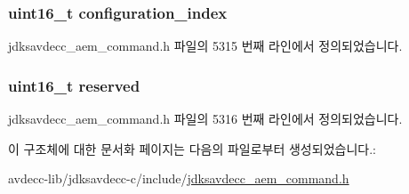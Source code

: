 \subsubsection[{\texorpdfstring{configuration\+\_\+index}{configuration_index}}]{\setlength{\rightskip}{0pt plus 5cm}uint16\+\_\+t configuration\+\_\+index}\hypertarget{structjdksavdecc__aem__command__write__descriptor__response_afaad1bd7c66f9611e134d8c5ce98f444}{}\label{structjdksavdecc__aem__command__write__descriptor__response_afaad1bd7c66f9611e134d8c5ce98f444}


jdksavdecc\+\_\+aem\+\_\+command.\+h 파일의 5315 번째 라인에서 정의되었습니다.

\subsubsection[{\texorpdfstring{reserved}{reserved}}]{\setlength{\rightskip}{0pt plus 5cm}uint16\+\_\+t reserved}\hypertarget{structjdksavdecc__aem__command__write__descriptor__response_a5a6ed8c04a3db86066924b1a1bf4dad3}{}\label{structjdksavdecc__aem__command__write__descriptor__response_a5a6ed8c04a3db86066924b1a1bf4dad3}


jdksavdecc\+\_\+aem\+\_\+command.\+h 파일의 5316 번째 라인에서 정의되었습니다.



이 구조체에 대한 문서화 페이지는 다음의 파일로부터 생성되었습니다.\+:\begin{DoxyCompactItemize}
\item 
avdecc-\/lib/jdksavdecc-\/c/include/\hyperlink{jdksavdecc__aem__command_8h}{jdksavdecc\+\_\+aem\+\_\+command.\+h}\end{DoxyCompactItemize}
